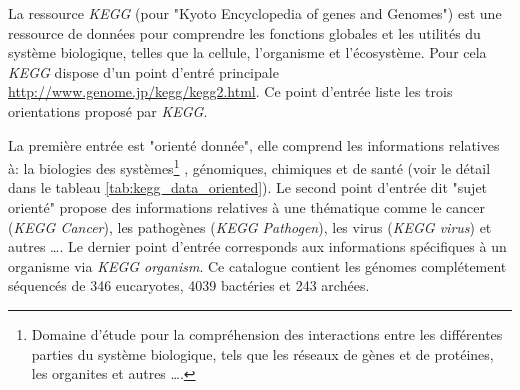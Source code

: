 \begin{refsegment}
    La ressource \textit{KEGG} (pour "Kyoto Encyclopedia of genes and Genomes") \cite{ogata1999kegg,kanehisa2000kegg,kanehisa2002kegg,kanehisa2004kegg,aoki2005using,kanehisa2010kegg,kanehisa2017kegg} est une ressource de données pour comprendre les fonctions globales et les utilités du système biologique, telles que la cellule, l'organisme et l'écosystème. Pour cela \textit{KEGG} dispose d'un point d'entré principale \url{http://www.genome.jp/kegg/kegg2.html}. Ce point d'entrée liste les trois orientations proposé par \textit{KEGG}.
    
    La première entrée est "orienté donnée", elle comprend les informations relatives à: la biologies des systèmes\footnote{Domaine d'étude pour la compréhension des interactions entre les différentes parties du système biologique, tels que les réseaux de gènes et de protéines, les organites et autres \ldots. } , génomiques, chimiques et de santé (voir le détail dans le tableau \ref{tab:kegg_data_oriented}). Le second point d'entrée dit "sujet orienté" propose des informations relatives à une thématique comme le cancer (\textit{KEGG Cancer}), les pathogènes (\textit{KEGG Pathogen}), les virus (\textit{KEGG virus}) et autres \ldots. Le dernier point d'entrée corresponds aux informations spécifiques à un organisme via \textit{KEGG organism}. Ce catalogue contient les génomes complétement séquencés de 346 eucaryotes, 4039 bactéries et 243 archées.  
    

\end{refsegment}

